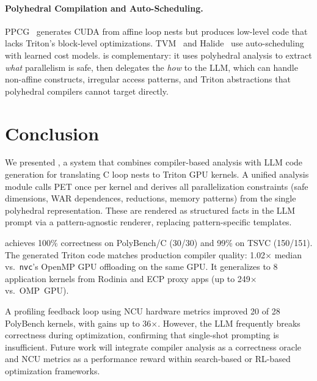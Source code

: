 \documentclass[sigconf]{acmart}
\begin{document}
\paragraph{Polyhedral Compilation and Auto-Scheduling.}
PPCG~\cite{verdoolaege2013ppcg} generates CUDA from affine loop nests but produces low-level code that lacks Triton's block-level optimizations.
TVM~\cite{chen2018tvm} and Halide~\cite{ragan2013halide} use auto-scheduling with learned cost models.
\sysname is complementary: it uses polyhedral analysis to extract \emph{what} parallelism is safe, then delegates the \emph{how} to the LLM, which can handle non-affine constructs, irregular access patterns, and Triton abstractions that polyhedral compilers cannot target directly.


\section{Conclusion}
\label{sec:conclusion}
We presented \sysname, a system that combines compiler-based analysis with LLM code generation for translating C loop nests to Triton GPU kernels. A unified analysis module calls PET once per kernel and derives all parallelization constraints (safe dimensions, WAR dependences, reductions, memory patterns) from the single polyhedral representation. These are rendered as structured facts in the LLM prompt via a pattern-agnostic renderer, replacing pattern-specific templates.

\sysname achieves 100\% correctness on PolyBench/C (30/30) and 99\% on TSVC (150/151). The generated Triton code matches production compiler quality: 1.02$\times$ median vs.\ \texttt{nvc}'s OpenMP GPU offloading on the same GPU. It generalizes to 8 application kernels from Rodinia and ECP proxy apps (up to 249$\times$ vs.\ OMP~GPU).

A profiling feedback loop using NCU hardware metrics improved 20 of 28 PolyBench kernels, with gains up to 36$\times$. However, the LLM frequently breaks correctness during optimization, confirming that single-shot prompting is insufficient. Future work will integrate compiler analysis as a correctness oracle and NCU metrics as a performance reward within search-based or RL-based optimization frameworks.
\end{document}
